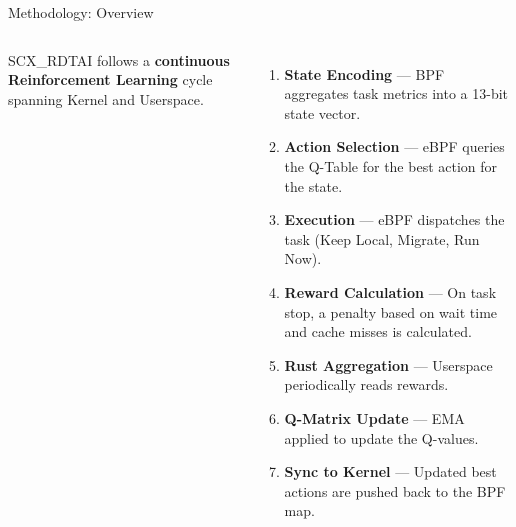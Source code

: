 \documentclass[aspectratio=169]{beamer}
\begin{document}
\begin{frame}{Methodology: Overview}
  \begin{columns}[T]
      \small
      SCX\_RDTAI follows a \textbf{continuous Reinforcement Learning} cycle spanning Kernel and Userspace.
      \vspace{6pt}
      \begin{enumerate}\itemsep3pt\scriptsize
        \item \textbf{State Encoding} — BPF aggregates task metrics into a 13-bit state vector.
        \item \textbf{Action Selection} — eBPF queries the Q-Table for the best action for the state.
        \item \textbf{Execution} — eBPF dispatches the task (Keep Local, Migrate, Run Now).
        \item \textbf{Reward Calculation} — On task stop, a penalty based on wait time and cache misses is calculated.
        \item \textbf{Rust Aggregation} — Userspace periodically reads rewards.
        \item \textbf{Q-Matrix Update} — EMA applied to update the Q-values.
        \item \textbf{Sync to Kernel} — Updated best actions are pushed back to the BPF map.
      \end{enumerate}
  \end{columns}
\end{frame}
\end{document}
